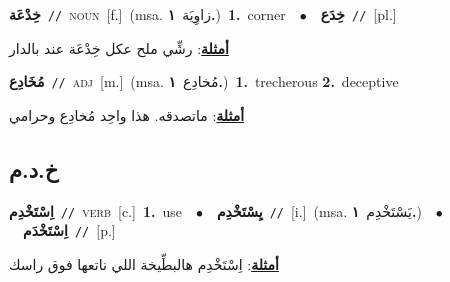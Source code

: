 \documentclass[10pt,a4paper,twoside]{article} %
\begin{document}
\begin{multicols}{2}
{{{{{{{{{{\setlength\topsep{0pt}\textbf{\foreignlanguage{arabic}{خِدْعَة}}\ {\color{gray}\texttt{//}\color{black}}\ \textsc{noun}\ [f.]\ \color{gray}(msa. \foreignlanguage{arabic}{زاوِيَة}~\foreignlanguage{arabic}{\textbf{١.}})\color{black}\ \textbf{1.}~corner\ \ $\bullet$\ \ \setlength\topsep{0pt}\textbf{\foreignlanguage{arabic}{خِدَع}}\ {\color{gray}\texttt{//}\color{black}}\ [pl.]\  \begin{flushright}\color{gray}\foreignlanguage{arabic}{\textbf{\underline{\foreignlanguage{arabic}{أمثلة}}}: رشِّي ملح عكل خِدْعَة عند بالدار}\end{flushright}\color{black}} \vspace{2mm}

{\setlength\topsep{0pt}\textbf{\foreignlanguage{arabic}{مُخَادِع}}\ {\color{gray}\texttt{//}\color{black}}\ \textsc{adj}\ [m.]\ \color{gray}(msa. \foreignlanguage{arabic}{مُخادِع}~\foreignlanguage{arabic}{\textbf{١.}})\color{black}\ \textbf{1.}~trecherous  \textbf{2.}~deceptive\  \begin{flushright}\color{gray}\foreignlanguage{arabic}{\textbf{\underline{\foreignlanguage{arabic}{أمثلة}}}: ماتصدقه. هذا واحِد مُخادِع وحرامي}\end{flushright}\color{black}} \vspace{2mm}

\vspace{-3mm}
\subsection*{\color{blue}\foreignlanguage{arabic}{خ.د.م}\color{blue}{}} 

{\setlength\topsep{0pt}\textbf{\foreignlanguage{arabic}{اِسْتَخْدِم}}\ {\color{gray}\texttt{//}\color{black}}\ \textsc{verb}\ [c.]\ \textbf{1.}~use\ \ $\bullet$\ \ \setlength\topsep{0pt}\textbf{\foreignlanguage{arabic}{يِسْتَخْدِم}}\ {\color{gray}\texttt{//}\color{black}}\ [i.]\ \color{gray}(msa. \foreignlanguage{arabic}{يَسْتَخْدِم}~\foreignlanguage{arabic}{\textbf{١.}})\color{black}\ \ $\bullet$\ \ \setlength\topsep{0pt}\textbf{\foreignlanguage{arabic}{اِسْتَخْدَم}}\ {\color{gray}\texttt{//}\color{black}}\ [p.]\  \begin{flushright}\color{gray}\foreignlanguage{arabic}{\textbf{\underline{\foreignlanguage{arabic}{أمثلة}}}: اِسْتَخْدِم هالبطِّيخة اللي ناتعها فوق راسك}\end{flushright}\color{black}} \vspace{2mm}

}}}}}}}}}
\end{multicols}
\end{document}
